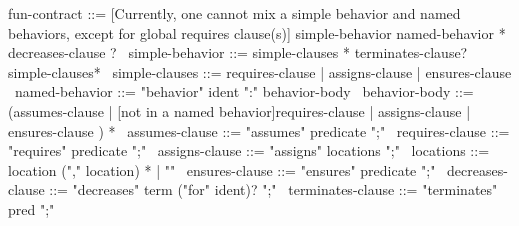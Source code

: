 \begin{syntax}
  fun-contract ::= {[Currently, one cannot mix a simple behavior and
    named behaviors, except for global requires clause(s)]
                simple-behavior named-behavior * decreases-clause ?}
  \
  simple-behavior ::= simple-clauses * terminates-clause? simple-clauses*
  \
  simple-clauses ::= requires-clause | assigns-clause | ensures-clause
  \
  named-behavior ::= "behavior" ident ":" behavior-body
  \
  behavior-body ::= (assumes-clause |
                     {[not in a named behavior]requires-clause}
                    | assigns-clause |
                      ensures-clause ) *
              \
  assumes-clause ::= "assumes" predicate ";"
  \
  requires-clause ::= "requires" predicate ";"
  \
  assigns-clause ::= "assigns" locations ";"
  \
  locations ::= location ("," location) * | "\nothing"
  \
  ensures-clause ::= "ensures" predicate ";"
  \
  decreases-clause ::= "decreases" term ("for" ident)? ";"
  \
  terminates-clause ::= "terminates" pred ";"
\end{syntax}
